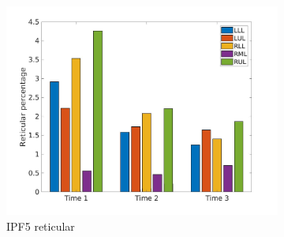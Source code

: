 \begin{figure}[H]
\begin{subfigure}{.46\linewidth}%
  \includegraphics[width=\linewidth,trim={{.0\wd0} {.0\wd0} {.0\wd0} {.0\wd0}},clip]{Appendix/Image_AppexA/LobarDistribution/IPF5ReticularLobarRegionDiseaseDistributionOverTime.jpg}
  \caption{IPF5 reticular}
  \label{fig:IPF5LobarRegionDiseaseDistributionOverTime-b}
\end{subfigure}
\begin{subfigure}{.46\linewidth}%

\end{subfigure}
\end{figure}
